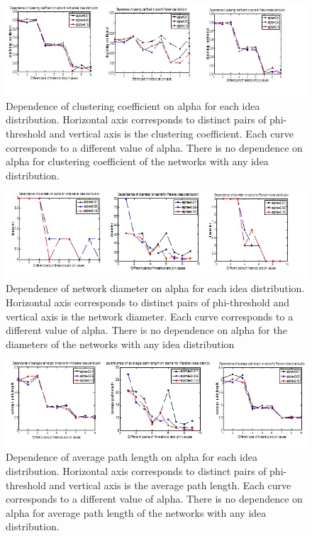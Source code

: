 \begin{figure}
[htp]
\begin{center}
\includegraphics{Fig11}
\end{center}
\caption{ Dependence of clustering coefficient on alpha for each idea distribution. Horizontal axis corresponds to distinct pairs of phi-threshold and   vertical axis is the clustering coefficient. Each curve corresponds to a different value of alpha. There is no dependence on alpha for clustering coefficient of the networks with any idea distribution.}
\label {fig11}
\end{figure}\begin{figure}
[htp]
\begin{center}
\includegraphics{Fig12}
\end{center}
\caption{ Dependence of network diameter on alpha for each idea distribution. Horizontal axis corresponds to distinct pairs of phi-threshold and vertical axis is the network diameter. Each curve corresponds to a different value of alpha. There is no dependence on alpha for the diameters of the networks with any idea distribution}
\label {fig12}
\end{figure}\begin{figure}
[htp]
\begin{center}
\includegraphics{Fig13}
\end{center}
\caption{Dependence of average path length on alpha for each idea distribution. Horizontal axis corresponds to distinct pairs of phi-threshold and   vertical axis is the average path length. Each curve corresponds to a different value of alpha. There is no dependence on alpha for average path length of the networks with any idea distribution.}
\label {fig13}
\end{figure}


